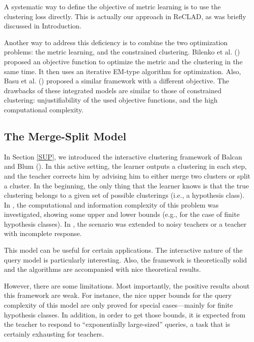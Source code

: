 \documentclass[letterpaper,12pt,titlepage,oneside,final]{book}
\begin{document}
A systematic way to define the objective of metric learning is to use the clustering loss directly. This is actually our approach in ReCLAD, as was briefly discussed in Introduction.

Another way to address this deficiency is to combine the two optimization problems: the metric learning, and the constrained clustering. Bilenko et al. (\cite{bilenko2004integrating}) proposed an objective function to optimize the metric and the clustering in the same time. It then uses an iterative EM-type algorithm for optimization. Also, Basu et al. (\cite{basu2003comparing}) proposed a similar framework with a different objective. The drawbacks of these integrated models are similar to those of constrained clustering: unjustifiability of the used objective functions, and the high computational complexity.


\subsection{The Merge-Split Model}

In Section \ref{SUP}, we introduced the interactive clustering framework of Balcan and Blum (\cite{balcan2008clustering}). In this active setting, the learner outputs a clustering in each step, and the teacher corrects him by advising him to either merge two clusters or split a cluster. In the beginning, the only thing that the learner knows is that the true clustering belongs to a given set of possible clusterings (i.e., a hypothesis class). In \cite{balcan2008clustering,awasthi2010supervised}, the computational and information complexity of this problem was investigated, showing some upper and lower bounds (e.g., for the case of finite hypothesis classes). In \cite{awasthi2010supervised}, the scenario was extended to noisy teachers or a teacher with incomplete response.

This model can be useful for certain applications. The interactive nature of the query model is particularly interesting. Also, the framework is theoretically solid and the algorithms are accompanied with nice theoretical results.

However, there are some limitations. Most importantly, the positive results about this framework are weak. For instance, the nice upper bounds for the query complexity of this model are only proved for special cases---mainly for finite hypothesis classes. In addition, in order to get those bounds, it is expected from the teacher to respond to ``exponentially large-sized'' queries, a task that is certainly exhausting for teachers.
\end{document}
